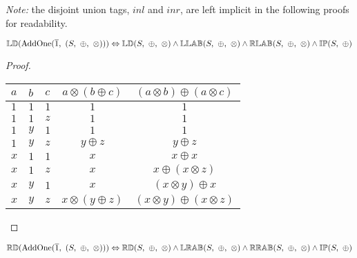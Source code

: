 \emph{Note:} the disjoint union tags, $inl$ and $inr$, are left implicit in the following proofs for readability.


\begin{theorem} \label{thm:addone_left_distributive}
$\propname{LD}(\mathrm{AddOne}(\overline{1},\ (S,\ \oplus,\ \otimes))) \Leftrightarrow \propname{LD}(S,\ \oplus,\ \otimes) \wedge \propname{LLAB}(S,\ \oplus,\ \otimes) \wedge \propname{RLAB}(S,\ \oplus,\ \otimes) \wedge \propname{IP}(S,\ \oplus) $
\end{theorem}

\begin{proof}
\begin{center}
\begin{tabular}{lllcc}
\toprule
$a$ & $b$ & $c$ & $a \otimes (b \oplus c)$ & $(a \otimes b) \oplus (a \otimes c)$ \\
\midrule
$1$ & $1$ & $1$ & $1$ 						& $1$ \\
$1$ & $1$ & $z$ & $1$						& $1$ \\
$1$ & $y$ & $1$ & $1$						& $1$ \\
$1$ & $y$ & $z$ & $y \oplus z$				& $y \oplus z$ \\
$x$ & $1$ & $1$ & $x$						& $x \oplus x$ \\
$x$ & $1$ & $z$ & $x$						& $x \oplus (x \otimes z)$ \\
$x$ & $y$ & $1$ & $x$						& $(x \otimes y) \oplus x$ \\
$x$ & $y$ & $z$ & $x \otimes (y \oplus z)$	& $(x \otimes y) \oplus (x \otimes z)$ \\
\bottomrule
\end{tabular}
\end{center}
\end{proof}





\begin{theorem} \label{thm:addone_right_distributive}
$\propname{RD}(\mathrm{AddOne}(\overline{1},\ (S,\ \oplus,\ \otimes))) \Leftrightarrow \propname{RD}(S,\ \oplus,\ \otimes) \wedge \propname{LRAB}(S,\ \oplus,\ \otimes) \wedge \propname{RRAB}(S,\ \oplus,\ \otimes) \wedge \propname{IP}(S,\ \oplus) $
\end{theorem}

